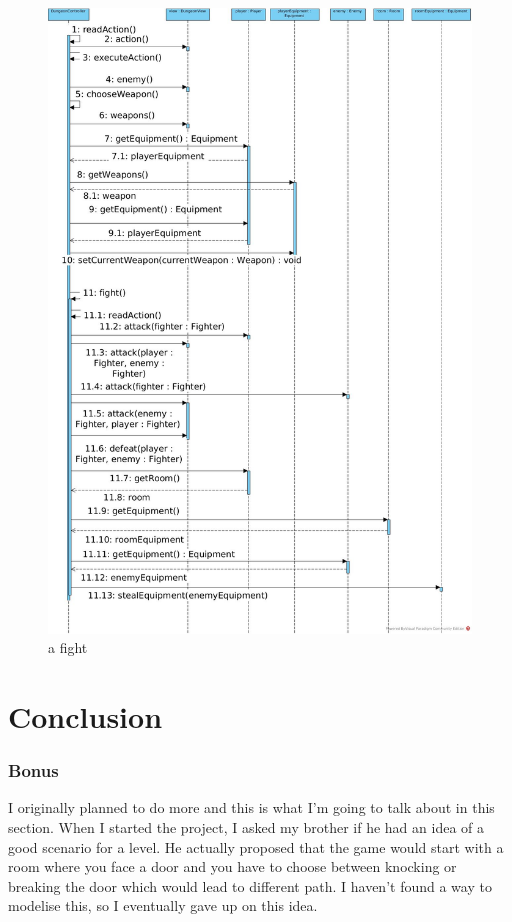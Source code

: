 \documentclass[11pt]{extarticle}
\begin{document}
\begin{figure}[th]
    \centering
    
    \caption{a fight}
    \label{fight}
    \includegraphics[scale = 0.25]{fight}
\end{figure}

\part{Conclusion}

\setcounter{section}{0}

\section{Bonus}

I originally planned to do more and this is what I'm going to talk about in this section. When I started the project, I asked my brother if he had an idea of a good scenario for a level. He actually proposed that the game would start with a room where you face a door and you have to choose between knocking or breaking the door which would lead to different path. I haven't found a way to modelise this, so I eventually gave up on this idea.
\end{document}
